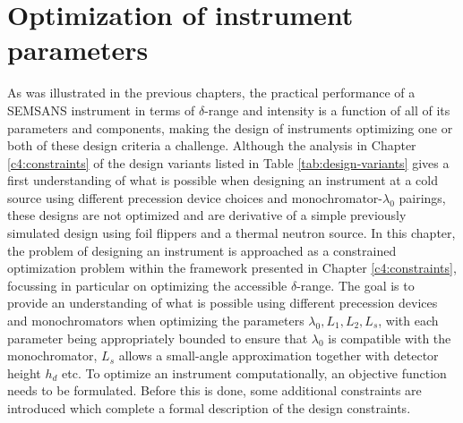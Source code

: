 \documentclass{article}
\begin{document}
\newpage
\section{Optimization of instrument parameters}
\label{c5:optimization}
As was illustrated in the previous chapters, the practical performance of a SEMSANS instrument in terms of $\delta$-range and intensity is a function of all of its parameters and components, making the design of instruments optimizing one or both of these design criteria a challenge. Although the analysis in Chapter \ref{c4:constraints} of the design variants listed in Table \ref{tab:design-variants} gives a first understanding of what is possible when designing an instrument at a cold source using different precession device choices and monochromator-$\lambda_0$ pairings, these designs are not optimized and are derivative of a simple previously simulated design \cite{bouwman2021b} using foil flippers and a thermal neutron source. In this chapter, the problem of designing an instrument is approached as a constrained optimization problem within the framework presented in Chapter \ref{c4:constraints}, focussing in particular on optimizing the accessible $\delta$-range. The goal is to provide an understanding of what is possible using different precession devices and monochromators when optimizing the parameters $\lambda_0, L_1, L_2, L_s$, with each parameter being appropriately bounded to ensure that $\lambda_0$ is compatible with the monochromator, $L_s$ allows a small-angle approximation together with detector height $h_d$ etc. 
To optimize an instrument computationally, an objective function needs to be formulated. Before this is done, some additional constraints are introduced which complete a formal description of the design constraints.
\end{document}
